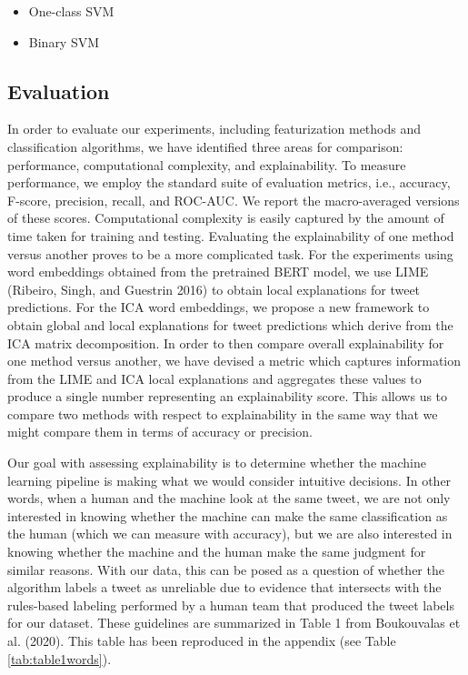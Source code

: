 \documentclass{article}
\begin{document}
\begin{itemize}
\tightlist
\item
  One-class SVM
\item
  Binary SVM
\end{itemize}

\hypertarget{evaluation}{%
\subsection{Evaluation}\label{evaluation}}

In order to evaluate our experiments, including featurization methods
and classification algorithms, we have identified three areas for
comparison: performance, computational complexity, and explainability.
To measure performance, we employ the standard suite of evaluation
metrics, i.e., accuracy, F-score, precision, recall, and ROC-AUC. We
report the macro-averaged versions of these scores. Computational
complexity is easily captured by the amount of time taken for training
and testing. Evaluating the explainability of one method versus another
proves to be a more complicated task. For the experiments using word
embeddings obtained from the pretrained BERT model, we use LIME
(Ribeiro, Singh, and Guestrin 2016) to obtain local explanations for
tweet predictions. For the ICA word embeddings, we propose a new
framework to obtain global and local explanations for tweet predictions
which derive from the ICA matrix decomposition. In order to then compare
overall explainability for one method versus another, we have devised a
metric which captures information from the LIME and ICA local
explanations and aggregates these values to produce a single number
representing an explainability score. This allows us to compare two
methods with respect to explainability in the same way that we might
compare them in terms of accuracy or precision.

Our goal with assessing explainability is to determine whether the
machine learning pipeline is making what we would consider intuitive
decisions. In other words, when a human and the machine look at the same
tweet, we are not only interested in knowing whether the machine can
make the same classification as the human (which we can measure with
accuracy), but we are also interested in knowing whether the machine and
the human make the same judgment for similar reasons. With our data,
this can be posed as a question of whether the algorithm labels a tweet
as unreliable due to evidence that intersects with the rules-based
labeling performed by a human team that produced the tweet labels for
our dataset. These guidelines are summarized in Table 1 from Boukouvalas
et al. (2020). This table has been reproduced in the appendix (see Table
\ref{tab:table1words}).
\end{document}
